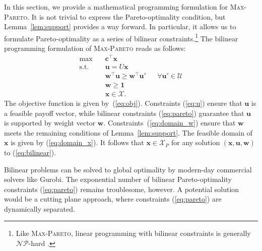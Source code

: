 \documentclass[a4paper, 11pt]{article}
\newcommand{\mc}{\mathcal}
\begin{document}
In this section, we provide a mathematical programming formulation for \textsc{Max-Pareto}. It is not trivial to express the Pareto-optimality condition, but Lemma~\ref{lem:support} provides a way forward. In particular, it allows us to formulate Pareto-optimality as a series of bilinear constraints.\footnote{Like \textsc{Max-Pareto}, linear programming with bilinear constraints is generally $\mc{NP}$-hard \citep{bennett1993bilinear}.} The bilinear programming formulation of \textsc{Max-Pareto} reads as follows: \begin{subequations}
\begin{align}
\max \quad & \bm{c}^\top \bm{x} \label{eq:obj} \\
\text{s.t.} \quad& \bm{u} = U \bm{x} \label{eq:u} \\
& \bm{w}^{\top} \bm{u} \geq  \bm{w}^\top \bm{u}' && \forall \bm{u}' \in \mc{U} \label{eq:pareto} \\  
& \bm{w} \geq \bm{1} \label{eq:domain_w} \\
& \bm{x} \in \mc{X} \label{eq:domain_x}. 
\end{align}
\label{eq:bilinear}
\end{subequations}
The objective function is given by~(\ref{eq:obj}). Constraints (\ref{eq:u}) ensure that $\bm{u}$ is a feasible payoff vector, while bilinear constraints (\ref{eq:pareto}) guarantee that $\bm{u}$ is supported by weight vector $\bm{w}$. Constraints~(\ref{eq:domain_w}) ensure that $\bm{w}$ meets the remaining conditions of Lemma~\ref{lem:support}. The feasible domain of $\bm{x}$ is given by (\ref{eq:domain_x}). It follows that $\bm{x} \in \mc{X}_P$ for any solution $(\bm{x}, \bm{u}, \bm{w})$ to (\ref{eq:bilinear}).

Bilinear problems can be solved to global optimality by modern-day commercial solvers like Gurobi. The exponential number of bilinear Pareto-optimality constraints (\ref{eq:pareto}) remains troublesome, however. A potential solution would be a cutting plane approach, where constraints (\ref{eq:pareto}) are dynamically separated. 
\end{document}

